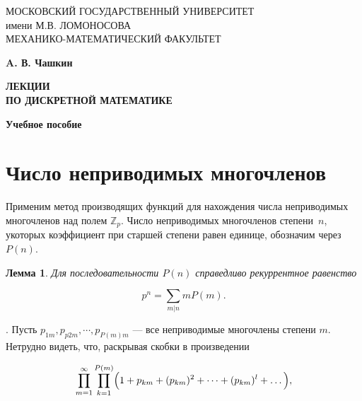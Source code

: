 \documentclass{article}
\numberwithin{equation}{section}
\begin{document}
    
    \begin{center}
        {\Large МОСКОВСКИЙ ГОСУДАРСТВЕННЫЙ УНИВЕРСИТЕТ\\
        имени М.В. ЛОМОНОСОВА\\
        МЕХАНИКО-МАТЕМАТИЧЕСКИЙ ФАКУЛЬТЕТ}
    \end{center} 
    
    \vspace{4cm}
    \begin{center}
        {\LARGE {\bf A. В. Чашкин}}
    \end{center}
    
    \begin{center}
        {\LARGE \bf{ЛЕКЦИИ\\
        ПО ДИСКРЕТНОЙ МАТЕМАТИКЕ}}
    \end{center}
    
    \begin{center}
         {\bf Учебное пособие}
    \end{center}
    \newpage
    
    \tableofcontents
    \newpage
    
    \section{Число неприводимых многочленов}
    
    Применим метод производящих функций для нахождения числа неприводимых многочленов над полем $\mathbb{Z}_p$.
    Число неприводимых многочленов степени~$n$, укоторых коэффициент при старшей степени равен единице, обозначим через $P(n)$.
    
    \newtheorem{Lem}{Лемма}
    \begin{Lem}
       Для последовательности $P(n)$ справедливо рекуррентное равенство
       \label{lem.1}
    \end{Lem}
    
    \begin{equation}
        p^n = \sum_{m|n} m P(m).
        \label{eq.1}
    \end{equation}
    
    {}.
    Пусть $p_{1m}, p_{p2m}, \cdots ,p_{P(m)m}$ --- все неприводимые многочлены степени $m$.
    Нетрудно видеть, что, раскрывая скобки в произведении
    
    \begin{equation}
        \prod_{m=1}^\infty \prod_{k=1}^{P(m)} \Bigl(1+p_{km}+(p_{km})^2+\cdots+(p_{km})^l+\dots \Bigl),
        \label{eq.2}
    \end{equation}
    
\end{document}
